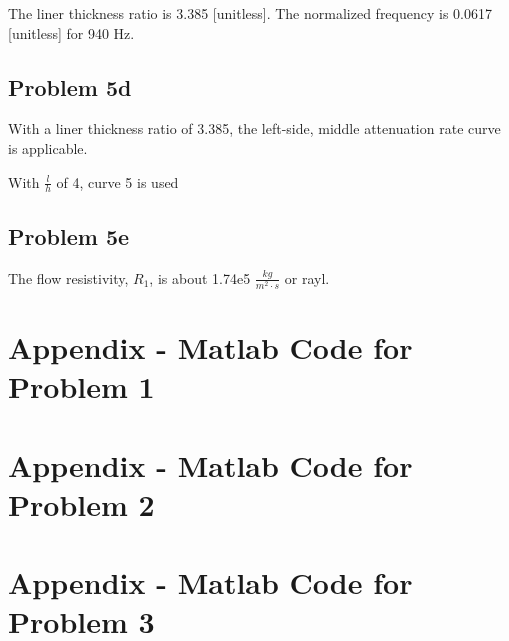 {{{{The liner thickness ratio is 3.385 [unitless].  The normalized frequency is 0.0617 [unitless] for 940 Hz.


\subsection*{Problem 5d}

With a liner thickness ratio of 3.385, the left-side, middle attenuation rate curve is applicable.

With $\frac{l}{h}$ of 4, curve 5 is used




\subsection*{Problem 5e}

The flow resistivity, $R_1$, is about 1.74e5 $\frac{kg}{m^2 \cdot s}$ or rayl.






\newpage
\section{Appendix - Matlab Code for Problem 1}
\label{appendix:problem1}





\newpage
\section{Appendix - Matlab Code for Problem 2}
\label{appendix:problem2}





\newpage
\section{Appendix - Matlab Code for Problem 3}
\label{appendix:problem3}





}}}}
